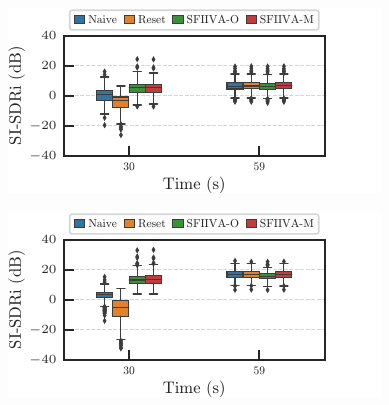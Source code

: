 \documentclass[sip,biber]{now-journal}
\begin{document}
\begin{figure}
  \centering
  \begin{minipage}[t]{.45\textwidth}
    \centering\includegraphics{figures/plots/clean/box_900.pdf}\label{fig:plot:box:900}
  \end{minipage}
  \hspace{.05\textwidth}
  \begin{minipage}[t]{.45\textwidth}
    \centering\includegraphics{figures/plots/clean/box_950.pdf}\label{fig:plot:box:950}
  \end{minipage}


\end{figure}
\end{document}
